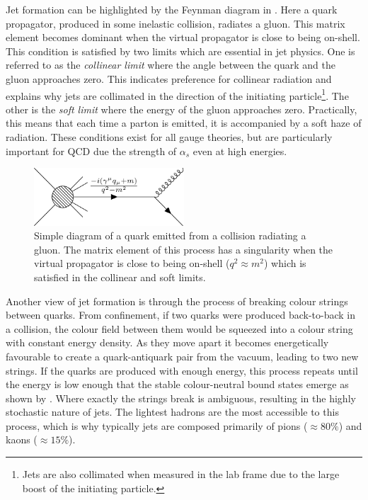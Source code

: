 Jet formation can be highlighted by the Feynman diagram in .
Here a quark propagator, produced in some inelastic collision, radiates a gluon.
This matrix element becomes dominant when the virtual propagator is close to being on-shell.
This condition is satisfied by two limits which are essential in jet physics.
One is referred to as the \textit{collinear limit} where the angle between the quark and the gluon approaches zero.
This indicates preference for collinear radiation and explains why jets are collimated in the direction of the initiating particle\footnote{Jets are also collimated when measured in the lab frame due to the large boost of the initiating particle.}.
The other is the \textit{soft limit} where the energy of the gluon approaches zero.
Practically, this means that each time a parton is emitted, it is accompanied by a soft haze of radiation.
These conditions exist for all gauge theories, but are particularly important for QCD due the strength of $\alpha_s$ even at high energies.

\begin{figure}[h]
    \centering
    \includegraphics[width=0.5\textwidth]{Feynman/quark_gluon.pdf}
    \caption{Simple diagram of a quark emitted from a collision radiating a gluon. The matrix element of this process has a singularity when the virtual propagator is close to being on-shell ($q^2\approx m^2$) which is satisfied in the collinear and soft limits.}
    \label{fig:quark_gluon}
\end{figure}

Another view of jet formation is through the process of breaking colour strings between quarks.
From confinement, if two quarks were produced back-to-back in a collision, the colour field between them would be squeezed into a colour string with constant energy density.
As they move apart it becomes energetically favourable to create a quark-antiquark pair from the vacuum, leading to two new strings.
If the quarks are produced with enough energy, this process repeats until the energy is low enough that the stable colour-neutral bound states emerge as shown by .
Where exactly the strings break is ambiguous, resulting in the highly stochastic nature of jets.
The lightest hadrons are the most accessible to this process, which is why typically jets are composed primarily of pions ($\approx80\%$) and kaons ($\approx15\%$).

